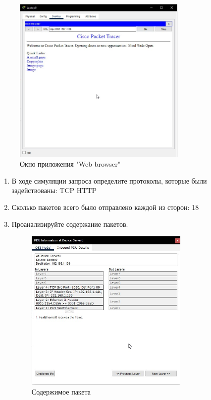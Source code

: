 \documentclass[bachelor, och, labwork]{shiza}
\begin{document}
\begin{enumerate}
    \begin{figure}[H]
        \centering      %
        \includegraphics[width=0.75\textwidth]{6}
        \caption{Окно приложения "Web browser"}
        \label{fig:image1}
    \end{figure}
    
    \begin{enumerate}
        \item В ходе симуляции запроса определите протоколы, которые были задействованы: TCP HTTP
        
        \item Сколько пакетов всего было отправлено каждой из сторон: 18
        
        \item Проанализируйте содержание пакетов.
        
        \begin{figure}[H]
            \centering      %
            \includegraphics[width=0.75\textwidth]{7}
            \caption{Содержимое пакета}
            \label{fig:image1}
        \end{figure}


\end{enumerate}
\end{enumerate}
\end{document}
